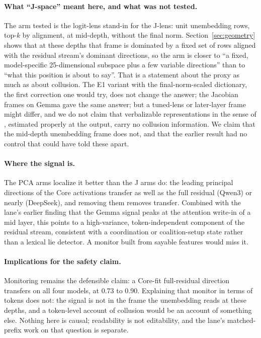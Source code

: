 \documentclass[11pt,a4paper]{article}
\begin{document}
\paragraph{What ``J-space'' meant here, and what was not tested.} The arm tested is the logit-lens stand-in for the J-lens: unit unembedding rows, top-$k$ by alignment, at mid-depth, without the final norm. Section~\ref{sec:geometry} shows that at these depths that frame is dominated by a fixed set of rows aligned with the residual stream's dominant directions, so the arm is closer to ``a fixed, model-specific 25-dimensional subspace plus a few variable directions'' than to ``what this position is about to say''. That is a statement about the proxy as much as about collusion. The E1 variant with the final-norm-scaled dictionary, the first correction one would try, does not change the answer; the Jacobian frames on Gemma gave the same answer; but a tuned-lens or later-layer frame might differ, and we do not claim that verbalizable representations in the sense of \citet{gurnee2026verbalizable}, estimated properly at the output, carry no collusion information. We claim that the mid-depth unembedding frame does not, and that the earlier result had no control that could have told these apart.

\paragraph{Where the signal is.} The PCA arms localize it better than the J arms do: the leading principal directions of the Core activations transfer as well as the full residual (Qwen3) or nearly (DeepSeek), and removing them removes transfer. Combined with the lane's earlier finding that the Gemma signal peaks at the attention write-in of a mid layer, this points to a high-variance, token-independent component of the residual stream, consistent with a coordination or coalition-setup state rather than a lexical lie detector. A monitor built from sayable features would miss it.

\paragraph{Implications for the safety claim.} Monitoring remains the defensible claim: a Core-fit full-residual direction transfers on all four models, at 0.73 to 0.90. Explaining that monitor in terms of tokens does not: the signal is not in the frame the unembedding reads at these depths, and a token-level account of collusion would be an account of something else. Nothing here is causal; readability is not editability, and the lane's matched-prefix work on that question is separate.
\end{document}
